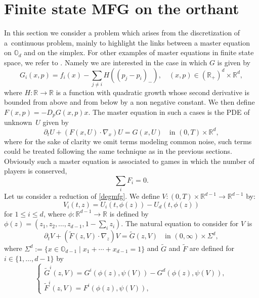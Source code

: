 \documentclass[JEP,XML,SOM,Unicode,NoEqCountersInSection,published]{cedram}
\let\sep\mid
\theoremstyle{definition}
\begin{document}
\section{Finite state MFG on the orthant}\label{app:B}
In this section we consider a problem which arises from the discretization of a~continuous problem, mainly to highlight the links between a master equation on $\mathbb{O}_d$ and on the simplex. For other examples of master equations in finite state space, we refer to \cite{bayraktar2019finite,bertucci2020mean}. Namely we are interested in the case in which $G$ is given by
\begin{equation}\label{discrete}
G_i(x,p) = f_i(x)-\sum_{j \ne i}H((p_{j}- p_i)_-),\quad (x,p) \in (\mathbb{R}_+)^d \times \mathbb{R}^d,
\end{equation}
where $H: \mathbb{R} \to \mathbb{R}$ is a function with quadratic growth whose second derivative is bounded from above and from below by a non negative constant. We then define $F(x,p) =- D_pG(x,p)x$. The master equation in such a cases is the PDE of unknown~$U$ given by
\begin{equation}\label{degmfg}
\partial_t U+(F(x,U)\cdot \nabla_x)U = G(x, U) \quad\text{in } (0,T)\times \mathbb{R}^d,
\end{equation}
where for the sake of clarity we omit terms modeling common noise, such terms could be treated following the same technique as in the previous sections. Obviously such a master equation is associated to games in which the number of players is conserved,~\ie
\begin{equation*}
\sum_{i}F_i = 0.
\end{equation*}
Let us consider a reduction of \eqref{degmfg}. We define $V:(0,T)\times \mathbb{R}^{d-1} \to \mathbb{R}^{d-1}$ by:
\begin{equation}\label{defV2}
V_i(t,z) = U_i(t,\phi(z))-U_d(t,\phi(z))
\end{equation}
for $1\leq i \leq d$, where $\phi: \mathbb{R}^{d-1}\to \mathbb{R}$ is defined by $\phi(z) = (z_1,z_2,\dots,z_{d-1},1-\sum_i z_i)$. The natural equation to consider for $V$ is
\begin{equation}\label{changmfg}
\partial_t V+(\tilde{F}(z,V)\cdot\nabla_z)V = \tilde{G}(z,V) \quad\text{in } (0, \infty) \times \Sigma^d,
\end{equation}
where $\Sigma^d:= \{ x \in \mathbb{O}_{d-1} \sep x_1+\cdots+ x_{d-1}= 1\}$ and $\tilde{G}$ and $\tilde{F}$ are defined for $i \in \{1,\dots,d-1\}$ by
\begin{equation*}
\begin{cases}
\tilde{G}^i(z,V) = G^i(\phi(z),\psi(V))- G^d(\phi(z),\psi(V)),\\
\tilde{F}^i(z,V) = F^i(\phi(z),\psi(V)),
\end{cases}
\end{equation*}
\end{document}
